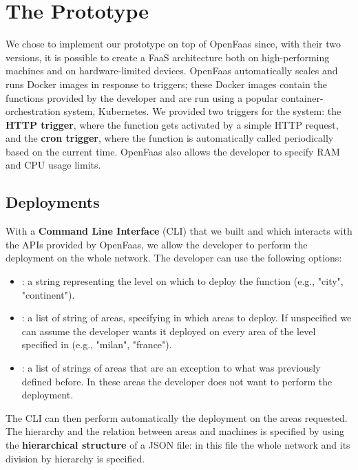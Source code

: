 \section{The Prototype}
\label{sec:prototype}

We chose to implement our prototype on top of OpenFaas since, with their two versions, it is possible to create a FaaS architecture both on high-performing machines and on hardware-limited devices.
OpenFaas automatically scales and runs Docker images in response to triggers; these Docker images contain the functions provided by the developer and are run using a popular container-orchestration system, Kubernetes.
We provided two triggers for the system: the \textbf{HTTP trigger}, where the function gets activated by a simple HTTP request, and the \textbf{cron trigger}, where the function is automatically called periodically based on the current time.
OpenFaas also allows the developer to specify RAM and CPU usage limits.


\subsection{Deployments}
With a \textbf{Command Line Interface} (CLI) that we built and which interacts with the APIs provided by OpenFaas, we allow the developer to perform the deployment on the whole network.
The developer can use the following options:
\begin{itemize}
    \item {}: a string representing the level on which to deploy the function (e.g., "city", "continent").
    \item {}: a list of string of areas, specifying in which areas to deploy. If unspecified we can assume the developer wants it deployed on every area of the level specified in  (e.g., "milan", "france"). 
    \item {}: a list of strings of areas that are an exception to what was previously defined before. In these areas the developer does not want to perform the deployment.
\end{itemize}
The CLI can then perform automatically the deployment on the areas requested. The hierarchy and the relation between areas and machines is specified by using the \textbf{hierarchical structure} of a JSON file: in this file the whole network and its division by hierarchy is specified.


